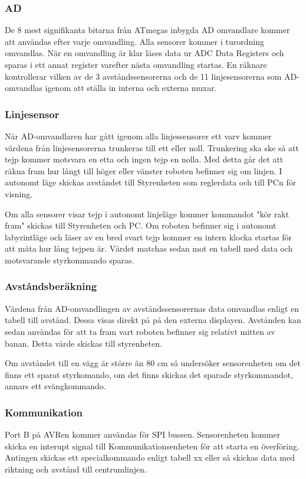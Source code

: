 \subsubsection{AD}
De 8 mest signifikanta bitarna från ATmegas inbygda AD omvandlare kommer att användas efter varje omvandling. Alla sensorer kommer i turordning omvandlas. När en omvandling är klar läses data ur ADC Data Registers och sparas i ett annat register varefter nästa omvandling startas. En räknare kontrollerar vilken av de 3 avståndssensorerna och de 11 linjesensorerna som AD-omvandlas igenom att ställa in interna och externa muxar.

\subsubsection{Linjesensor}
När AD-omvandlaren har gått igenom alla linjessensorer ett varv kommer värdena från linjesensorerna trunkeras till ett eller noll. Trunkering ska ske så att tejp kommer motsvara en etta och ingen tejp en nolla. Med detta går det att räkna fram hur långt till höger eller vänster roboten befinner sig om linjen. I autonomt läge skickas avståndet till Styrenheten som reglerdata och till PCn för visning.

Om alla sensorer visar tejp i autonomt linjeläge kommer kommandot "kör rakt fram" skickas till Styrenheten och PC.
Om roboten befinner sig i autonomt labyrintläge och läser av en bred svart tejp kommer en intern klocka startas för att mäta hur lång tejpen är. Värdet matchas sedan mot en tabell med data och motsvarande styrkommando sparas.

\subsubsection{Avståndsberäkning}
Värdena från AD-omvandlingen av avståndssensorernas data omvandlas enligt en tabell till avstånd. Dessa visas direkt på på den externa displayen. Avstånden kan sedan användas för att ta fram vart roboten befinner sig relativt mitten av banan. Detta värde skickas till styrenheten.

Om avståndet till en vägg är större än 80 cm så undersöker sensorenheten om det finns ett sparat styrkomando, om det finns skickas det sparade styrkommandot, annars ett svängkommando.

\subsubsection{Kommunikation}
Port B på AVRen kommer användas för SPI bussen. Sensorenheten kommer skicka en interupt signal till Kommunikationsenheten för att starta en överföring. Antingen skickas ett specialkommando enligt tabell xx eller så skickas data med riktning och avstånd till centrumlinjen.

